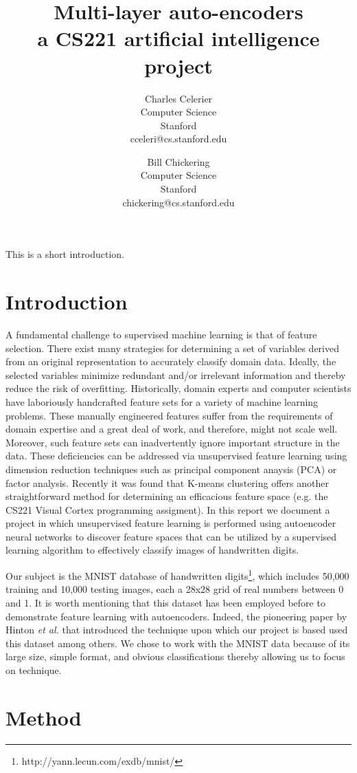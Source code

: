 \documentclass{article}
\title{Multi-layer auto-encoders \\
    \large{a CS221 artificial intelligence project}}
\author{
    Charles Celerier \\
    Computer Science \\
    Stanford \\
    cceleri@cs.stanford.edu
  \and
    Bill Chickering \\
    Computer Science \\
    Stanford \\
    chickering@cs.stanford.edu
}
\begin{document}
\maketitle

This is a short introduction.

\section{Introduction}\label{sec:introduction}

A fundamental challenge to supervised machine learning is that of feature
selection. There exist many strategies for determining a set of variables
derived from an original representation to accurately classify domain data.
Ideally, the selected variables minimize redundant and/or irrelevant information
and thereby reduce the risk of overfitting. Historically, domain experts and
computer scientists have laboriously handcrafted feature sets for a variety of
machine learning problems. These manually engineered features suffer from the
requirements of domain expertise and a great deal of work, and therefore, might
not scale well. Moreover, such feature sets can inadvertently ignore important
structure in the data. These deficiencies can be addressed via unsupervised
feature learning using dimension reduction techniques such as principal
component anaysis (PCA) or factor analysis. Recently it was found that K-means
clustering offers another straightforward method for determining an efficacious
feature space (e.g. the CS221 Visual Cortex programming assigment). In this
report we document a project in which unsupervised feature learning is performed
using autoencoder neural networks to discover feature spaces that can be
utilized by a supervised learning algorithm to effectively classify images of
handwritten digits.

Our subject is the MNIST database of handwritten
digits\footnote{http://yann.lecun.com/exdb/mnist/}, which includes 50,000
training and 10,000 testing images, each a 28x28 grid of real numbers between 0
and 1. It is worth mentioning that this dataset has been employed before to
demonstrate feature learning with autoencoders. Indeed, the pioneering paper by
Hinton {\em et al.}\cite{art:HS} that introduced the technique upon which our
project is based used this dataset among others. We chose to work with the MNIST
data because of its large size, simple format, and obvious classifications
thereby allowing us to focus on technique.

\section{Method}\label{sec:method}
\end{document}
